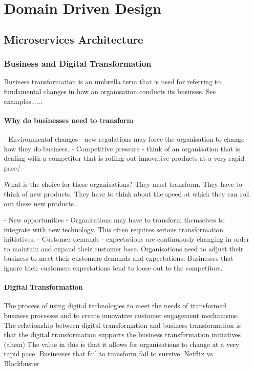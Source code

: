 \documentclass[a4paper, 11pt]{book}
\begin{document}
    \part{Domain Driven Design}


    \chapter{Microservices Architecture}

    \section{Business and Digital Transformation}
    Business transformation is an umbrella term that is used for referring to fundamental changes in how an organisation conducts its business.
    See examples......
    \subsection{Why do businesses need to transform}
    - Environmental changes - new regulations may force the organisation to change how they do business.
    - Competitive pressure - think of an organisation that is dealing with a competitor that is rolling out innovative products at a very rapid pace/

    What is the choice for these organisations?
    They must transform.
    They have to think of new products.
    They have to think about the speed at which they can roll out these new products.

    - New opportunities - Organisations may have to transform themselves to integrate with new technology.
    This often requires serious transformation initiatives.
    - Customer demands - expectations are continuously changing in order to maintain and expand their customer base.
    Organisations need to adjust their business to meet their customers demands and expectations.
    Businesses that ignore their customers expectations tend to loose out to the competitors.

    \subsection{Digital Transformation}
    The process of using digital technologies to meet the needs of transformed business processes and to create innovative customer engagement mechanisms.
    The relationship between digital transformation and business transformation is that the digital transformation supports the business transformation initiatives (ahem)
    The value in this is that it allows for organisations to change at a very rapid pace.
    Businesses that fail to transform fail to survive.
    Netflix vs Blockbuster
\end{document}
